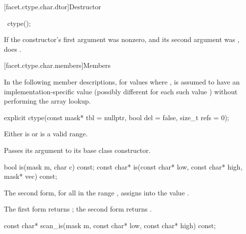 [facet.ctype.char.dtor]{Destructor}

%
\begin{itemdecl}
~ctype();
\end{itemdecl}

\begin{itemdescr}
\pnum
\effects
If the constructor's first argument was nonzero, and its second argument
was , does
.
\end{itemdescr}

[facet.ctype.char.members]{Members}

\pnum
{}%
In the following member descriptions, for
values  where ,
 is assumed to have an
implementation-specific value (possibly different for each
such value ) without performing the array lookup.

%
\begin{itemdecl}
explicit ctype(const mask* tbl = nullptr, bool del = false, size_t refs = 0);
\end{itemdecl}

\begin{itemdescr}
\pnum
\expects
Either  is  or  is a valid range.

\pnum
\effects
Passes its  argument to its base class constructor.
\end{itemdescr}

%
\begin{itemdecl}
bool        is(mask m, char c) const;
const char* is(const char* low, const char* high, mask* vec) const;
\end{itemdecl}

\begin{itemdescr}
\pnum
\effects
The second form, for all
in the range
,
assigns
into
the value
.

\pnum
\returns
The first form returns
;
the second form returns .
\end{itemdescr}

%
\begin{itemdecl}
const char* scan_is(mask m, const char* low, const char* high) const;
\end{itemdecl}

